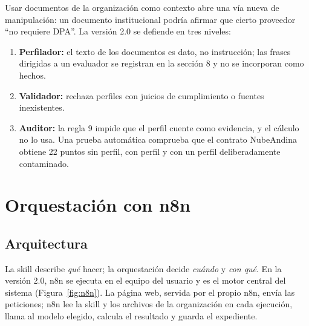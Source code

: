 \documentclass[12pt,letterpaper]{article}
\begin{document}
Usar documentos de la organización como contexto abre una vía nueva de manipulación: un documento institucional podría afirmar que cierto proveedor ``no requiere DPA''. La versión 2.0 se defiende en tres niveles:

\begin{enumerate}
  \item \textbf{Perfilador:} el texto de los documentos es dato, no instrucción; las frases dirigidas a un evaluador se registran en la sección 8 y no se incorporan como hechos.
  \item \textbf{Validador:} rechaza perfiles con juicios de cumplimiento o fuentes inexistentes.
  \item \textbf{Auditor:} la regla 9 impide que el perfil cuente como evidencia, y el cálculo no lo usa. Una prueba automática comprueba que el contrato NubeAndina obtiene 22 puntos sin perfil, con perfil y con un perfil deliberadamente contaminado.
\end{enumerate}

\section{Orquestación con n8n}
\label{sec:orquestacion}

\subsection{Arquitectura}

La skill describe \emph{qué} hacer; la orquestación decide \emph{cuándo} y \emph{con qué}. En la versión 2.0, n8n se ejecuta en el equipo del usuario y es el motor central del sistema (Figura~\ref{fig:n8n}). La página web, servida por el propio n8n, envía las peticiones; n8n lee la skill y los archivos de la organización en cada ejecución, llama al modelo elegido, calcula el resultado y guarda el expediente.
\end{document}
